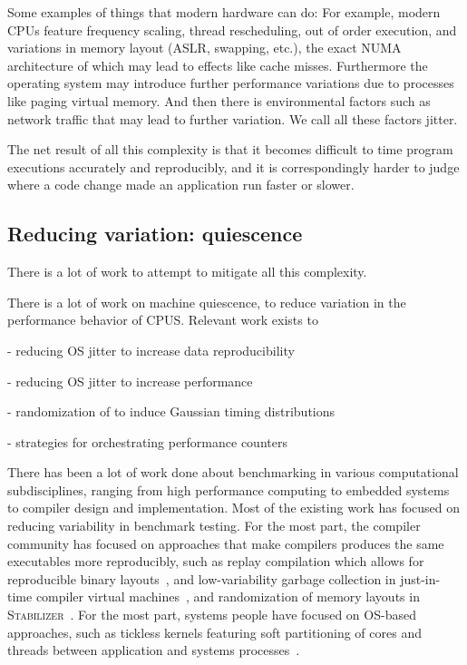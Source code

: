 \documentclass[conference]{IEEEtran}
\begin{document}
Some examples of things that modern hardware can do:
For example, modern CPUs feature frequency scaling, thread rescheduling,
out of order execution,
and variations in memory layout (ASLR, swapping, etc.), the exact NUMA architecture
of which may lead to effects like cache misses.
Furthermore the operating system may introduce further performance variations
due to processes like paging virtual memory.
And then there is environmental factors such as network traffic that may lead to
further variation. We call all these factors jitter.

The net result of all this complexity is that it becomes difficult to time
program executions accurately and reproducibly, and it is correspondingly harder
to judge where a code change made an application run faster or slower.

\subsection{Reducing variation: quiescence}

There is a lot of work to attempt to mitigate all this complexity.

There is a lot of work on machine quiescence, to reduce variation in the performance
behavior of CPUS. Relevant work exists to


- reducing OS jitter to increase data reproducibility

- reducing OS jitter to increase performance

- randomization of  to induce Gaussian timing distributions

- strategies for orchestrating performance counters

There has been a lot of work done about benchmarking in various computational subdisciplines, ranging from high performance computing to embedded systems to compiler design and implementation.
Most of the existing work has focused on reducing variability in benchmark testing.
For the most part, the compiler community has focused on approaches that make compilers produces the same executables more reproducibly, such as replay compilation which allows for reproducible binary layouts~\cite{Georges2008}, and low-variability garbage collection in just-in-time compiler virtual machines~\cite{Huang2004}, and randomization of memory layouts in \textsc{Stabilizer}~\cite{Curtsinger2013}. For the most part, systems people have focused on OS-based approaches, such as tickless kernels featuring soft partitioning of cores and threads between application and systems processes~\cite{Akkan2012}.
\end{document}
